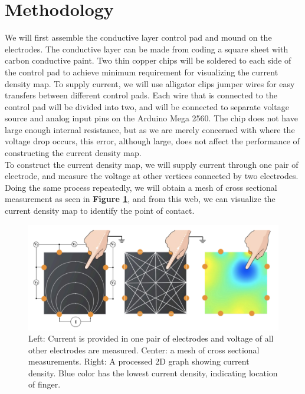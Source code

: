 \documentclass[a4paper,12pt]{article}
\begin{document}
\section{Methodology}
\indent We will first assemble the conductive layer control pad and mound on the electrodes. The conductive layer can be made from coding a square sheet  with carbon conductive paint. Two thin copper chips will be soldered to each side of the control pad to achieve minimum requirement for visualizing the current density map. To supply current, we will use alligator clips jumper wires for easy transfers between different control pads. Each wire that is connected to the control pad will be divided into two, and will be connected to separate voltage source and analog input pins on the Arduino Mega 2560. The chip does not have large enough internal resistance, but as we are merely concerned with where the voltage drop occurs, this error, although large, does not affect the performance of constructing the current density map.
\\\indent To construct the current density map, we will supply current through one pair of electrode, and measure the voltage at other vertices connected by two electrodes. Doing the same process repeatedly, we will obtain a mesh of cross sectional measurement as seen in \textbf{Figure \ref{fig:electrick}}, and from this web, we can visualize the current density map to identify the point of contact.


\begin{figure}[t]
	\centering
	\includegraphics[width=5in]{graph.png}
	\caption{Left: Current is provided in one pair of electrodes and voltage of all other electrodes are measured. Center: a mesh of cross sectional measurements. Right: A processed 2D graph showing current density. Blue color has the lowest current density, indicating location of finger.\cite{Zhang2017}}
	\label{fig:electrick}
\end{figure}
\end{document}
